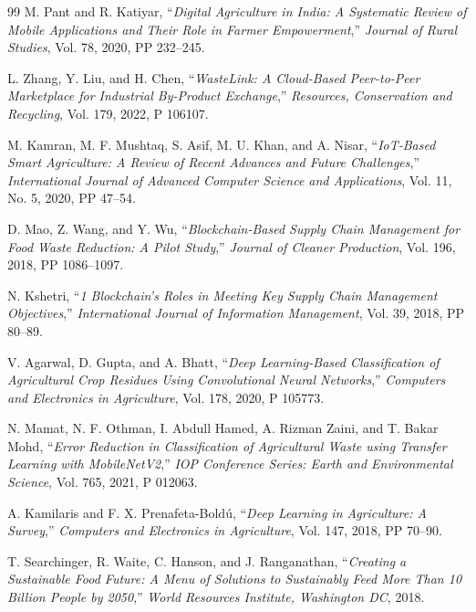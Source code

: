 \documentclass[a4paper,12pt,oneside]{report}
\begin{document}
\begin{thebibliography}{99}
     M. Pant and R. Katiyar, ``\textit{Digital Agriculture in India: A Systematic Review of Mobile Applications and Their Role in Farmer Empowerment},'' \textit{Journal of Rural Studies}, Vol. 78, 2020, PP 232--245.

     L. Zhang, Y. Liu, and H. Chen, ``\textit{WasteLink: A Cloud-Based Peer-to-Peer Marketplace for Industrial By-Product Exchange},'' \textit{Resources, Conservation and Recycling}, Vol. 179, 2022, P 106107.

     M. Kamran, M. F. Mushtaq, S. Asif, M. U. Khan, and A. Nisar, ``\textit{IoT-Based Smart Agriculture: A Review of Recent Advances and Future Challenges},'' \textit{International Journal of Advanced Computer Science and Applications}, Vol. 11, No. 5, 2020, PP 47--54.

     D. Mao, Z. Wang, and Y. Wu, ``\textit{Blockchain-Based Supply Chain Management for Food Waste Reduction: A Pilot Study},'' \textit{Journal of Cleaner Production}, Vol. 196, 2018, PP 1086--1097.

     N. Kshetri, ``\textit{1 Blockchain's Roles in Meeting Key Supply Chain Management Objectives},'' \textit{International Journal of Information Management}, Vol. 39, 2018, PP 80--89.

     V. Agarwal, D. Gupta, and A. Bhatt, ``\textit{Deep Learning-Based Classification of Agricultural Crop Residues Using Convolutional Neural Networks},'' \textit{Computers and Electronics in Agriculture}, Vol. 178, 2020, P 105773.

     N. Mamat, N. F. Othman, I. Abdull Hamed, A. Rizman Zaini, and T. Bakar Mohd, ``\textit{Error Reduction in Classification of Agricultural Waste using Transfer Learning with MobileNetV2},'' \textit{IOP Conference Series: Earth and Environmental Science}, Vol. 765, 2021, P 012063.

     A. Kamilaris and F. X. Prenafeta-Bold\'u, ``\textit{Deep Learning in Agriculture: A Survey},'' \textit{Computers and Electronics in Agriculture}, Vol. 147, 2018, PP 70--90.

     T. Searchinger, R. Waite, C. Hanson, and J. Ranganathan, ``\textit{Creating a Sustainable Food Future: A Menu of Solutions to Sustainably Feed More Than 10 Billion People by 2050},'' \textit{World Resources Institute, Washington DC}, 2018.


\end{thebibliography}
\end{document}
